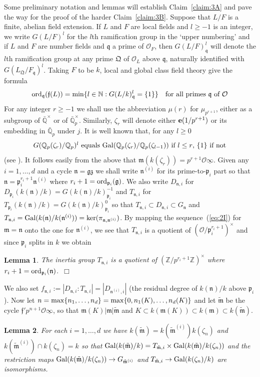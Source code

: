 \documentclass[12pt]{article}
\newtheorem{lemma}{Lemma}[section]
\newcounter{rem}[section]%
\newcommand{\barbbQ}{\ensuremath{\bar{\bbQ}}}
\newcommand{\bbN}{\ensuremath{\mathbb{N}}}
\newcommand{\bbQ}{\ensuremath{\mathbb{Q}}}
\newcommand{\bbZ}{\ensuremath{\mathbb{Z}}}
\newcommand{\be}{\ensuremath{{\bf e}}}
\newcommand{\beql}[1]{\begin{equation}\label{#1}}
\newcommand{\cO}{\ensuremath{\mathcal{O}}}
\newcommand{\eeq}{\end{equation}}
\newcommand{\ePf}{\hspace*{\fill}~$\Box$\vertsp\par}%
\newcommand{\ff}{\ensuremath{\mathfrak{f}}}
\newcommand{\fg}{\ensuremath{\mathfrak{g}}}
\newcommand{\fm}{\ensuremath{\mathfrak{m}}}
\newcommand{\fn}{\ensuremath{\mathfrak{n}}}
\newcommand{\fp}{\ensuremath{\mathfrak{p}}}
\newcommand{\fq}{\ensuremath{\mathfrak{q}}}
\newcommand{\fQ}{\ensuremath{\mathfrak{Q}}}
\newcommand{\fz}{\ensuremath{\mathfrak{z}}}
\newcommand{\Gal}{{\rm Gal}}
\newcommand{\ord}{{\rm ord}}
\newcommand{\refeq}[1]{~(\ref{eq:#1})}
\newcommand{\rem}{\refstepcounter{rem}\noindent{\sc Remark \therem}}%
\renewcommand{\therem}{\thesection.\arabic{rem}}
\newcommand{\vertsp}{\vspace{1ex}}
\newcommand{\tfm}{\ensuremath{{\tilde{\fm}}}}
\newcommand{\tfmi}{\ensuremath{{\tfm^{(i)}}}}
\newcommand{\uinf}{\ensuremath{{\underline{\infty}}}}
\begin{document}
Some preliminary notation and lemmas will establish
Claim~\ref{claim:3A} and pave the way for the proof of the
harder Claim~\ref{claim:3B}. Suppose that $L/F$ is a finite,
abelian field extension. If $L$ and $F$ are local fields and
$l\geq -1$ is an integer, we write $G(L/F)^l$ for the $l$th ramification
group in the `upper numbering' and if $L$ and $F$ are number
fields and $\fq$  a prime of $\cO_F$, then $G(L/F)^l_\fq$ will
denote the $l$th ramification group at any prime $\fQ$ of $\cO_L$
above $\fq$, naturally identified with $G(L_\fQ/F_\fq)^l$. Taking
$F$ to be $k$, local and global class field theory give the
formula \beql{eq:3D} \ord_\fq(\ff(L))=
\min\{l\in\bbN:G(L/k)^l_\fq=\{1\}\}\ \ \ \mbox{for all primes
$\fq$ of $\cO$} \eeq
For any integer $r\geq -1$ we shall use the
abbreviation $\mu(r)$ for $\mu_{p^{r+1}}$, either as a
subgroup of $\barbbQ^\times$ or of $\barbbQ_p^\times$. Similarly,
$\zeta_r$ will denote either $\be(1/p^{r+1})$ or its embedding in $\barbbQ_p$ under $j$.
It is well known that, for any $l\geq 0$
\beql{eq:3E}
\mbox{$G(\bbQ_p(\zeta_r)/\bbQ_p)^l$ equals
$\Gal(\bbQ_p(\zeta_r)/\bbQ_p(\zeta_{l-1}))$
if $l\leq r$, $\{1\}$ if not}
\eeq
(see \cite[Ch.~IV]{SerreLF}). It follows easily from the above
that $\fm(k(\zeta_r))=p^{r+1}\cO\uinf$.
Given any $i=1,\ldots,d$ and a cycle $\fn=\fg\fz$
we shall write $\fn^{(i)}$ for its prime-to-$\fp_i$ part
so that $\fn=\fp_i^{r_i+1}\fn^{(i)}$ where $r_i+1=\ord_{\fp_i}(\fg)$.
We also write $D_{\fn,i}$ for $D_{\fp_i}(k(\fn)/k)=G(k(\fn)/k)^{-1}_{\fp_i}$
and $T_{\fn,i}$ for $T_{\fp_i}(k(\fn)/k)=G(k(\fn)/k)^{0}_{\fp_i}$ so that
$T_{\fn,i}\subset D_{\fn,i}\subset G_\fn$ and
$T_{\fn,i}=\Gal(k(\fn)/k(\fn^{(i)}))=\ker(\pi_{\fn,\fn^{(i)}})$.
By mapping the sequence\refeq{2I} for $\fm=\fn$ onto the one for $\fn^{(i)}$, we see that
$T_{\fn,i}$ is a quotient of $(\cO/\fp_i^{r_i+1})^\times$ and since
$\fp_i$ splits in $k$ we obtain
\begin{lemma}\label{lemma:3A}
The inertia group $T_{\fn,i}$ is a quotient of $(\bbZ/p^{r_i+1}\bbZ)^\times$
where $r_i+1=\ord_{\fp_i}(\fn)$.\ePf
\end{lemma}
We also set $f_{\fn,i}:=|D_{\fn,i}:T_{\fn,i}|=|D_{\fn^{(i)},i}|$
(the residual degree of $k(\fn)/k$ above $\fp_i$).
Now let $n={\rm max}\{n_1,\ldots,n_d\}={\rm max}\{0,n_1(K),\ldots,n_d(K)\}$
and let $\tfm$ be the cycle $\ff'p^{n+1}\cO\uinf$, so that $\fm(K)|\fm|\tfm$
and $K\subset k(\fm(K))\subset k(\fm)\subset k(\tfm)$.
\begin{lemma}\label{lemma:3A.5}
For each $i=1,\ldots,d$ we have $k(\tfm)=k(\tfm^{(i)})k(\zeta_n)$ and
$k(\tfm^{(i)})\cap k(\zeta_n)=k$ so that $\Gal(k(\tfm)/k)=T_{\tfm,i}\times
\Gal(k(\tfm)/k(\zeta_n))$
and the restriction maps $\Gal(k(\tfm)/k(\zeta_n))\rightarrow G_\tfmi$
and $T_{\tfm,i}\rightarrow\Gal(k(\zeta_n)/k)$ are isomorphisms.
\end{lemma}
\end{document}
